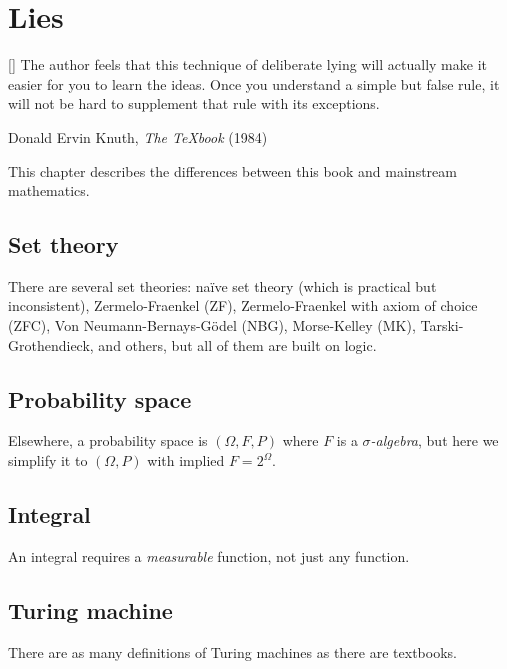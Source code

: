 \chapter{Lies}

\epigraph{
    [\textellipsis] The author feels that this technique of deliberate lying will actually make it easier for you to learn the ideas.
Once you understand a simple but false rule, it will not be hard to supplement that rule with its exceptions.
}{Donald Ervin Knuth, \emph{The \TeX{}book} (1984)}

This chapter describes the differences between this book and mainstream mathematics.

\section{Set theory}

%
There are several set theories:
na\"ive set theory (which is practical but inconsistent),
Zermelo-Fraenkel (ZF),
Zermelo-Fraenkel with axiom of choice (ZFC),
Von Neumann-Bernays-G\"odel (NBG),
Morse-Kelley (MK),
Tarski-Grothendieck,
and others,
but all of them are built on logic.

\section{Probability space}

%
Elsewhere, a probability space is \((\Omega,F,P)\) where \(F\) is a \emph{\(\sigma\)-algebra},
but here we simplify it to \((\Omega,P)\) with implied \(F = 2^\Omega\).

\section{Integral}

%
%
%
An integral requires a \emph{measurable} function, not just any function.

\section{Turing machine}

There are as many definitions of Turing machines as there are textbooks.
